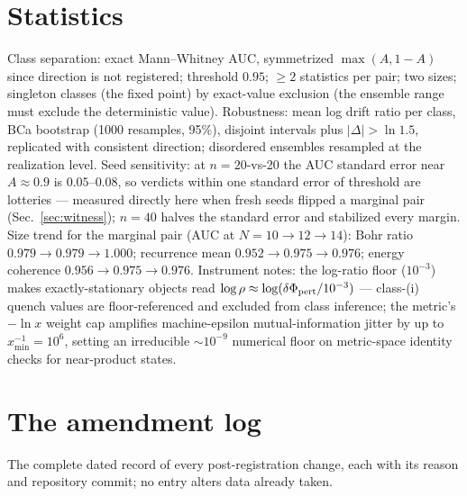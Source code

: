 \documentclass[a4paper,11pt,noarxiv]{quantumarticle}
\newcommand{\logr}{\log\rho}
\begin{document}
\section{Statistics}\label{app:stats}

Class separation: exact Mann--Whitney AUC, symmetrized $\max(A, 1-A)$
since direction is not registered; threshold $0.95$; $\geq 2$
statistics per pair; two sizes; singleton classes (the fixed point) by
exact-value exclusion (the ensemble range must exclude the
deterministic value). Robustness: mean log drift ratio per class, BCa
bootstrap (1000 resamples, 95\%), disjoint intervals plus $|\Delta| >
\ln 1.5$, replicated with consistent direction; disordered ensembles
resampled at the realization level. Seed sensitivity: at $n=20$-vs-20
the AUC standard error near $A \approx 0.9$ is $0.05$--$0.08$, so
verdicts within one standard error of threshold are lotteries ---
measured directly here when fresh seeds flipped a marginal pair
(Sec.~\ref{sec:witness}); $n = 40$ halves the standard error and
stabilized every margin. Size trend for the marginal pair (AUC at $N =
10 \to 12 \to 14$): Bohr ratio $0.979 \to 0.979 \to 1.000$; recurrence
mean $0.952 \to 0.975 \to 0.976$; energy coherence $0.956 \to 0.975 \to
0.976$. Instrument notes: the log-ratio floor ($10^{-3}$) makes
exactly-stationary objects read $\logr \approx
\log(\delta\Phi_{\rm pert}/10^{-3})$ --- class-(i) quench values are
floor-referenced and excluded from class inference; the metric's
$-\ln x$ weight cap amplifies machine-epsilon mutual-information jitter
by up to $x_{\min}^{-1}=10^6$, setting an irreducible $\sim 10^{-9}$
numerical floor on metric-space identity checks for near-product
states.

\section{The amendment log}\label{app:log}

The complete dated record of every post-registration change, each with
its reason and repository commit; no entry alters data already taken.
\end{document}
